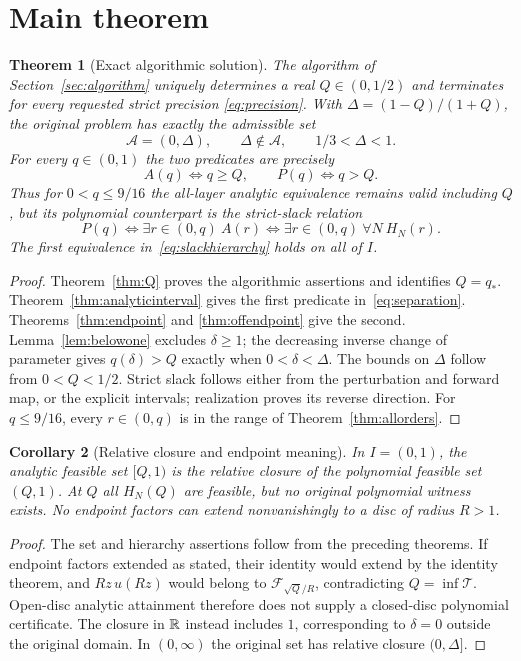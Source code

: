 \documentclass[11pt,a4paper]{article}
\newtheorem{theorem}{Theorem}[section]
\newtheorem{corollary}[theorem]{Corollary}
\theoremstyle{definition}\newtheorem{definition}[theorem]{Definition}
\theoremstyle{remark}\newtheorem{remark}[theorem]{Remark}
\newcommand{\Adm}{\mathcal A}\newcommand{\F}{\mathcal F}
\newcommand{\T}{\mathcal T}\newcommand{\Kc}{\mathcal K}
\begin{document}
\section{Main theorem}\label{sec:main}
\begin{theorem}[Exact algorithmic solution]\label{thm:main}
The algorithm of Section~\ref{sec:algorithm} uniquely determines a real
$Q\in(0,1/2)$ and terminates for every requested strict precision
\eqref{eq:precision}. With $\Delta=(1-Q)/(1+Q)$, the original problem
has exactly the admissible set
\begin{equation}\label{eq:main}
 \boxed{\Adm=(0,\Delta),\qquad \Delta\notin\Adm,\qquad1/3<\Delta<1.}
\end{equation}
For every $q\in(0,1)$ the two predicates are precisely
\begin{equation}\label{eq:separation}
 \boxed{A(q)\Longleftrightarrow q\geq Q,\qquad
        P(q)\Longleftrightarrow q>Q.}
\end{equation}
Thus for $0<q\leq9/16$ the all-layer analytic equivalence remains valid
including $Q$, but its polynomial counterpart is the strict-slack relation
\begin{equation}\label{eq:slackhierarchy}
 P(q)\Longleftrightarrow\exists r\in(0,q)\ A(r)
 \Longleftrightarrow\exists r\in(0,q)\ \forall N\ H_N(r).
\end{equation}
The first equivalence in~\eqref{eq:slackhierarchy} holds on all of $I$.
\end{theorem}
\begin{proof}
Theorem~\ref{thm:Q} proves the algorithmic assertions and identifies
$Q=q_*$. Theorem~\ref{thm:analyticinterval} gives the first predicate
in~\eqref{eq:separation}. Theorems~\ref{thm:endpoint} and
\ref{thm:offendpoint} give the second. Lemma~\ref{lem:belowone} excludes
$\delta\geq1$; the decreasing inverse change of parameter gives
$q(\delta)>Q$ exactly when $0<\delta<\Delta$. The bounds on $\Delta$
follow from $0<Q<1/2$. Strict slack follows either from the perturbation
and forward map, or the explicit intervals; realization proves its
reverse direction. For $q\leq9/16$, every $r\in(0,q)$ is in the
range of Theorem~\ref{thm:allorders}.
\end{proof}

\begin{corollary}[Relative closure and endpoint meaning]\label{cor:closure}
In $I=(0,1)$, the analytic feasible set $[Q,1)$ is the relative closure
of the polynomial feasible set $(Q,1)$. At $Q$ all $H_N(Q)$ are feasible,
but no original polynomial witness exists. No endpoint factors can extend
nonvanishingly to a disc of radius $R>1$.
\end{corollary}
\begin{proof}
The set and hierarchy assertions follow from the preceding theorems.
If endpoint factors extended as stated, their identity would extend by
the identity theorem, and $Rz\,u(Rz)$ would belong to
$\F_{\sqrt Q/R}$, contradicting $Q=\inf\T$. Open-disc analytic
attainment therefore does not supply a closed-disc polynomial certificate.
The closure in $\mathbb R$ instead includes $1$, corresponding to $\delta=0$
outside the original domain. In $(0,\infty)$ the original set has
relative closure $(0,\Delta]$.
\end{proof}
\end{document}
